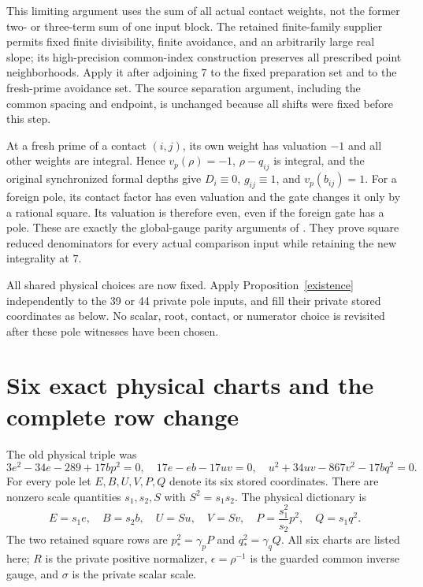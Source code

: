 \documentclass[11pt]{article}
\begin{document}
This limiting argument uses the sum of all actual contact weights,
not the former two- or three-term sum of one input block. The
retained finite-family supplier permits fixed finite divisibility,
finite avoidance, and an arbitrarily large real slope; its
high-precision common-index construction preserves all prescribed
point neighborhoods. Apply it after adjoining $7$ to the fixed
preparation set and to the fresh-prime avoidance set. The source
separation argument, including the common spacing and endpoint,
is unchanged because all shifts were fixed before this step.

At a fresh prime of a contact $(i,j)$, its own weight has valuation
$-1$ and all other weights are integral. Hence $v_p(\rho)=-1$,
$\rho-q_{ij}$ is integral, and the original synchronized formal
depths give $D_i\equiv0$, $g_{ij}\equiv1$, and $v_p(b_{ij})=1$.
For a foreign pole, its contact factor has even valuation and the
gate changes it only by a rational square. Its valuation is
therefore even, even if the foreign gate has a pole. These are
exactly the global-gauge parity arguments of \cite{global}.
They prove square reduced denominators for every actual comparison
input while retaining the new integrality at $7$.

All shared physical choices are now fixed. Apply
Proposition~\ref{existence} independently to the 39 or 44 private
pole inputs, and fill their private stored coordinates as below.
No scalar, root, contact, or numerator choice is revisited after
these pole witnesses have been chosen.

\section{Six exact physical charts and the complete row change}

The old physical triple was
\begin{equation}\label{oldphysical}
 3e^2-34e-289+17bp^2=0,\quad
 17e-eb-17uv=0,\quad
 u^2+34uv-867v^2-17bq^2=0.
\end{equation}
For every pole let $E,B,U,V,P,Q$ denote its six stored coordinates.
There are nonzero scale quantities $s_1,s_2,S$ with $S^2=s_1s_2$.
The physical dictionary is
\begin{equation}\label{dictionary}
 E=s_1e,\quad B=s_2b,\quad U=Su,\quad V=Sv,\quad
 P=\frac{s_1^2}{s_2}p^2,\quad Q=s_1q^2.
\end{equation}
The two retained square rows are $p_*^2=\gamma_pP$ and
$q_*^2=\gamma_qQ$. All six charts are listed here; $R$ is the
private positive normalizer, $\epsilon=\rho^{-1}$ is the guarded
common inverse gauge, and $\sigma$ is the private scalar scale.
\end{document}
